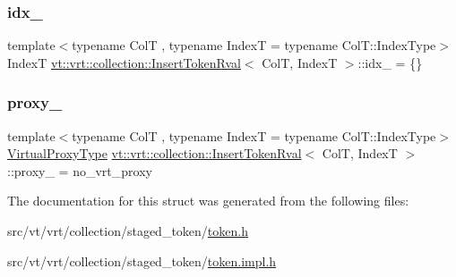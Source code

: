 \mbox{\label{structvt_1_1vrt_1_1collection_1_1_insert_token_rval_a24f53a4a29fa2a3ef166619b7e9ba4f2}} 
\subsubsection{\texorpdfstring{idx\+\_\+}{idx\_}}
{\footnotesize\ttfamily template$<$typename ColT , typename IndexT  = typename Col\+T\+::\+Index\+Type$>$ \\
IndexT \hyperlink{structvt_1_1vrt_1_1collection_1_1_insert_token_rval}{vt\+::vrt\+::collection\+::\+Insert\+Token\+Rval}$<$ ColT, IndexT $>$\+::idx\+\_\+ = \{\}\hspace{0.3cm}{\ttfamily [private]}}

\mbox{\label{structvt_1_1vrt_1_1collection_1_1_insert_token_rval_a9eb736a9d35655244886202938b41a60}} 
\subsubsection{\texorpdfstring{proxy\+\_\+}{proxy\_}}
{\footnotesize\ttfamily template$<$typename ColT , typename IndexT  = typename Col\+T\+::\+Index\+Type$>$ \\
\hyperlink{namespacevt_a1b417dd5d684f045bb58a0ede70045ac}{Virtual\+Proxy\+Type} \hyperlink{structvt_1_1vrt_1_1collection_1_1_insert_token_rval}{vt\+::vrt\+::collection\+::\+Insert\+Token\+Rval}$<$ ColT, IndexT $>$\+::proxy\+\_\+ = no\+\_\+vrt\+\_\+proxy\hspace{0.3cm}{\ttfamily [private]}}



The documentation for this struct was generated from the following files\+:\begin{DoxyCompactItemize}
\item 
src/vt/vrt/collection/staged\+\_\+token/\hyperlink{token_8h}{token.\+h}\item 
src/vt/vrt/collection/staged\+\_\+token/\hyperlink{token_8impl_8h}{token.\+impl.\+h}\end{DoxyCompactItemize}
